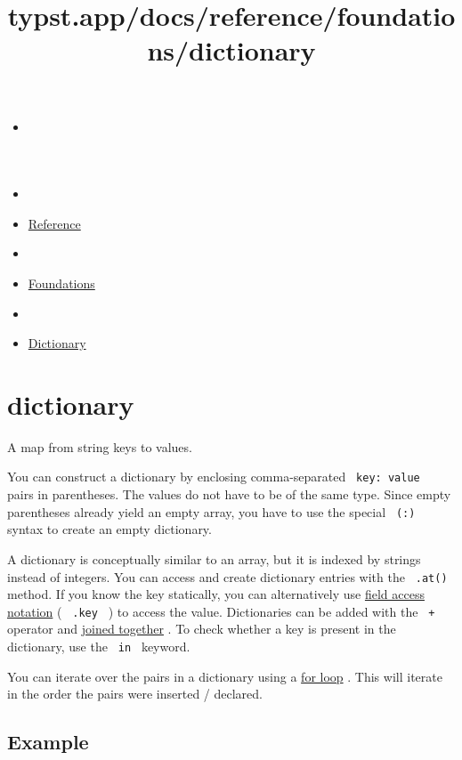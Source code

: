 \title{typst.app/docs/reference/foundations/dictionary}

\begin{itemize}
\tightlist
\item
  \href{/docs}{}
\item
  
\item
  \href{/docs/reference/}{Reference}
\item
  
\item
  \href{/docs/reference/foundations/}{Foundations}
\item
  
\item
  \href{/docs/reference/foundations/dictionary/}{Dictionary}
\end{itemize}

\section{\texorpdfstring{{ dictionary }}{ dictionary }}\label{summary}

A map from string keys to values.

You can construct a dictionary by enclosing comma-separated
\texttt{\ key:\ value\ } pairs in parentheses. The values do not have to
be of the same type. Since empty parentheses already yield an empty
array, you have to use the special \texttt{\ (:)\ } syntax to create an
empty dictionary.

A dictionary is conceptually similar to an array, but it is indexed by
strings instead of integers. You can access and create dictionary
entries with the \texttt{\ .at()\ } method. If you know the key
statically, you can alternatively use
\href{/docs/reference/scripting/\#fields}{field access notation} (
\texttt{\ .key\ } ) to access the value. Dictionaries can be added with
the \texttt{\ +\ } operator and
\href{/docs/reference/scripting/\#blocks}{joined together} . To check
whether a key is present in the dictionary, use the \texttt{\ in\ }
keyword.

You can iterate over the pairs in a dictionary using a
\href{/docs/reference/scripting/\#loops}{for loop} . This will iterate
in the order the pairs were inserted / declared.

\subsection{Example}\label{example}

